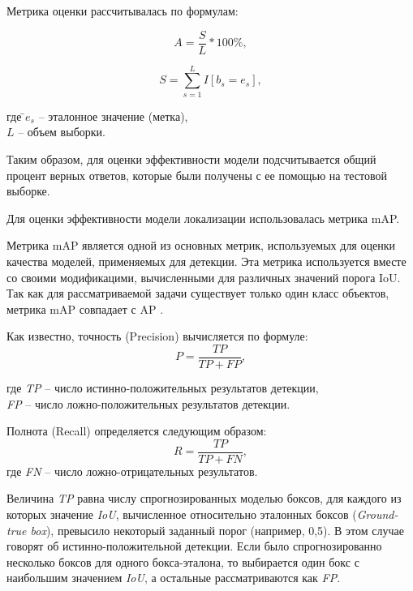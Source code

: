 Метрика оценки рассчитывалась по формулам:

\begin{equation*}
    A = \frac{S}{L} * 100\%,
\end{equation*}

\begin{equation*}
    S = \sum_{s=1}^L I[b_s = e_s],
\end{equation*}
\begin{tabbing}
где \=$e_s$ -- эталонное значение (метка),\\
\>$L$ -- объем выборки. 
\end{tabbing}

Таким образом, для оценки эффективности модели подсчитывается общий процент верных ответов, которые были получены с ее помощью на тестовой выборке.

Для оценки эффективности модели локализации использовалась метрика mAP.

Метрика mAP является одной из основных метрик, используемых для оценки качества моделей, применяемых для детекции. Эта метрика используется вместе со своими модификацими, вычисленными для различных значений порога IoU. Так как для рассматриваемой задачи существует только один класс объектов, метрика mAP совпадает с AP \cite[c.~11]{Everingham2010}.

Как известно, точность (Precision) вычисляется по формуле:
\begin{equation}
	\label{eq:precision}
    P = \frac{TP}{TP + FP},
\end{equation}
\begin{tabbing}
где \=\textit{TP} -- число истинно-положительных результатов детекции,\\
\>\textit{FP} -- число ложно-положительных результатов детекции.
\end{tabbing}

Полнота (Recall) определяется следующим образом:
\begin{equation}
	\label{eq:recall}
    R = \frac{TP}{TP + FN},
\end{equation}
где \textit{FN} -- число ложно-отрицательных результатов.

Величина \textit{TP} равна числу спрогнозированных моделью боксов, для каждого из которых значение \textit{IoU}, вычисленное относительно эталонных боксов (\textit{Ground-true box}), превысило некоторый заданный порог (например, 0,5). В этом случае говорят об истинно-положительной детекции. Если было спрогнозированно несколько боксов для одного бокса-эталона, то выбирается один бокс с наибольшим значением \textit{IoU}, а остальные рассматриваются как \textit{FP}.

